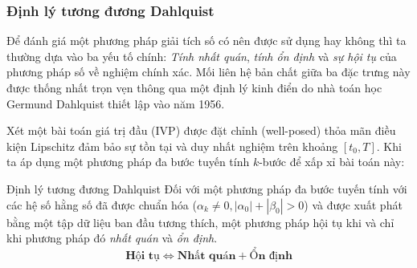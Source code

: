 \subsubsection{Định lý tương đương Dahlquist}


Để đánh giá một phương pháp giải tích số có nên được sử dụng hay không thì ta thường dựa vào ba yếu tố chính: \textit{Tính nhất quán}, \textit{tính ổn định} và  \textit{sự hội tụ} của phương pháp số về nghiệm chính xác. Mối liên hệ bản chất giữa ba đặc trưng này được thống nhất trọn vẹn thông qua một định lý kinh điển do nhà toán học Germund Dahlquist thiết lập vào năm 1956.

\vspace{0.5em}

Xét một bài toán giá trị đầu (IVP) được đặt chỉnh (well-posed) thỏa mãn điều kiện Lipschitz đảm bảo sự tồn tại và duy nhất nghiệm trên khoảng $[t_0, T]$. Khi ta áp dụng một phương pháp đa bước tuyến tính $k$-bước để xấp xỉ bài toán này:

\begin{baitapbox}{Định lý tương đương Dahlquist}
    Đối với một phương pháp đa bước tuyến tính với các hệ số hằng số đã được chuẩn hóa ($\alpha_k \neq 0, |\alpha_0| + |\beta_0| > 0$) và được xuất phát bằng một tập dữ liệu ban đầu tương thích, một phương pháp hội tụ khi và chỉ khi phương pháp đó \textit{nhất quán} và \textit{ổn định}.
    \[
        \textbf{Hội tụ} \iff \textbf{Nhất quán} + \textbf{Ổn định}
    \]
\end{baitapbox}

\vspace{0.5em}


